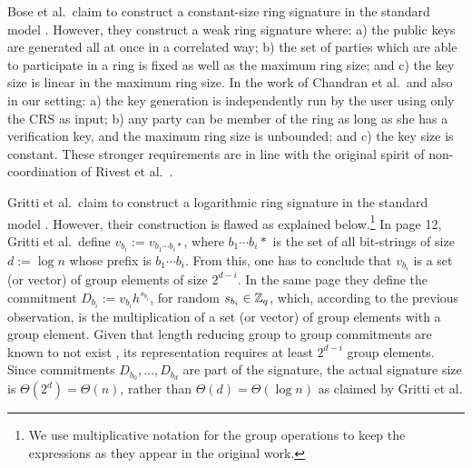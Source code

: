 Bose et al.~claim to construct a constant-size ring signature in the standard model \cite{ACISP:BosDasRan15}. However, they construct a weak ring signature where: a) the public keys are generated all at once in a correlated way; b) the set of parties which are able to participate in a ring is fixed as well as the maximum ring size; and c) the key size is linear in the maximum ring size. In the work of Chandran et al.~and also in our setting: a) the key generation is independently run by the user using only the CRS as input; b) any party can be member of the ring as long as she has a verification key, and the maximum ring size is unbounded; and c) the key size is constant. These stronger requirements are in line with the original spirit of {non-coordination} of  Rivest et al.~\cite{AC:RivShaTau01}.

Gritti et al.~claim to construct a logarithmic ring signature in the standard model \cite{IET:GriSusPla16}. However, their construction is flawed as explained below.\footnote{We use multiplicative notation for the group operations to keep the expressions as they appear in the original work.}
In page 12, Gritti et al.~define $v_{b_i} := v_{b_1\cdots b_i *}$, where $b_1\cdots b_i *$ is the set of all bit-strings of size $d:=\log n$ whose prefix is $b_1\cdots b_i$. From this, one has to conclude that $v_{b_i}$ is a set (or vector) of group elements of size $2^{d-i}$.
In the same page they define the commitment $D_{b_i} := v_{b_i}h^{s_{b_i}}$, for random $s_{b_i}\in\mathbb{Z}_q$, which, according to the previous observation, is the multiplication of a set (or vector) of group elements with a group element. Given that length reducing group to group commitments are known to not exist \cite{EC:AbeHarOhk12}, its representation requires at least $2^{d-i}$ group elements. Since commitments $D_{b_0},\ldots,D_{b_d}$ are part of the signature, the actual signature size is $\Theta(2^d)=\Theta(n)$, rather than  $\Theta(d)=\Theta(\log n)$ as claimed by Gritti et al.

